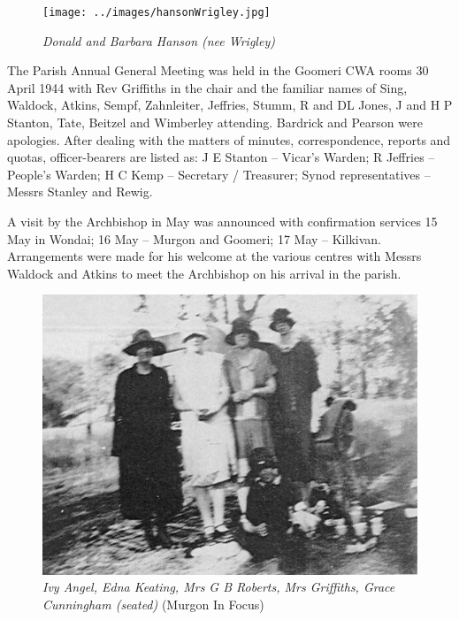 \begin{figure}
\begin{center}
\texttt{[image: ../images/hansonWrigley.jpg]}
\caption{\itshape Donald and Barbara Hanson (nee Wrigley)}
\end{center}
\end{figure}




\balance


The Parish Annual General Meeting was held in the Goomeri CWA rooms 30 April 1944 with Rev Griffiths in the chair and the familiar names of Sing, Waldock, Atkins, Sempf, Zahnleiter, Jeffries, Stumm, R and DL Jones, J and H P Stanton, Tate, Beitzel and Wimberley attending. Bardrick and Pearson were apologies. After dealing with the matters of minutes, correspondence, reports and quotas, officer-bearers are listed as: J E Stanton -- Vicar's Warden; R Jeffries -- People's Warden; H C Kemp -- Secretary / Treasurer; Synod representatives -- Messrs Stanley and Rewig.



A visit by the Archbishop in May was announced with confirmation services 15 May in Wondai; 16 May -- Murgon and Goomeri; 17 May -- Kilkivan. Arrangements were made for his welcome at the various centres with Messrs Waldock and Atkins to meet the Archbishop on his arrival in the parish.









\begin{figure}[htb]
\begin{center}
\includegraphics[width=1.\textwidth,center]{../images/mrsGriffiths.jpg}
\caption{{\itshape Ivy Angel, Edna Keating, Mrs G B Roberts, Mrs Griffiths, Grace Cunningham (seated)} {\scriptsize(Murgon In Focus)}}
\end{center}
\end{figure}




